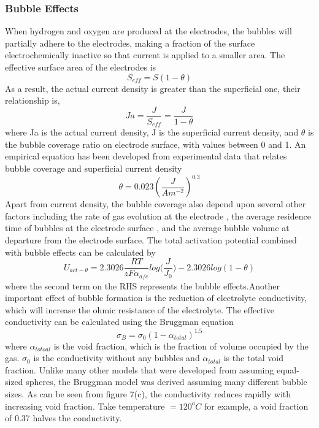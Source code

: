 \subsubsection{Bubble Effects}
When hydrogen and oxygen are produced at the electrodes, the bubbles will partially adhere to the electrodes, making a fraction of the surface electrochemically inactive so that current is applied to a smaller area. The effective surface area of the electrodes is
\begin{equation} 
S_{eff} = S(1-\theta)
\end{equation}
As a result, the actual current density is greater than the superficial one, their relationship is,
\begin{equation} 
Ja = \frac{J}{S_{eff}} = \frac{J}{1-\theta}
\end{equation} 
where Ja is the actual current density, J is the superficial current density, and $\theta$ is the bubble coverage ratio on electrode surface, with values between 0 and 1. An empirical equation has been developed from experimental data that relates bubble coverage and superficial current density \cite{bubble2} 
\begin{equation}
\theta = 0.023(\frac{J}{Am^{-2}})^{0.3}
\end{equation} 
Apart from current density, the bubble coverage also depend upon several other factors including the rate of gas evolution at the electrode   ,  the average residence time of bubbles at the electrode surface , and the average bubble volume at departure from the electrode surface.\cite{bubble2} The total activation potential combined with bubble effects can be calculated by\cite{activation4} 
\begin{equation} 
U_{act-\theta} = 2.3026\frac{RT}{zF\alpha_{a/c}}{log(\frac{J}{J_0}}) - 2.3026log(1-\theta) 
\end{equation} 
where the second term on the RHS represents the bubble effects.Another important effect of bubble formation is  the reduction of electrolyte conductivity, which will increase the ohmic resistance of the electrolyte. The effective conductivity  can be calculated using the Bruggman equation\cite{void} 
\begin{equation}
\sigma_B = \sigma_0(1- \alpha_{total})^{1.5}
\end{equation}
where $\alpha_{totoal}$ is the void fraction, which is the fraction of volume occupied by the gas. $\sigma_0$ is the conductivity without any bubbles and $\alpha_{total}$ is the total void fraction. Unlike many other models  that were developed from assuming equal-sized spheres, the Bruggman model was derived assuming many different bubble sizes.  As can be seen from figure 7(c), the conductivity reduces rapidly with increasing void fraction. Take temperature $= 120^oC$ for example, a void fraction of 0.37 halves the conductivity. %

